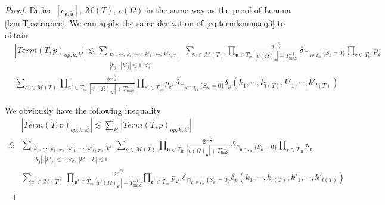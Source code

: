\begin{proof}
Define $[c_{\mathfrak{n},\widetilde{\mathfrak{n}}}]$, $\mathscr{M}(T)$, $c(\Omega)$ in the same way as the proof of Lemma \ref{lem.Tpvariance}. We can apply the same derivation of \eqref{eq.termlemmaeq3} to obtain
\begin{equation}\label{eq.termlemmaeq3op}
\begin{split}
    &|Term(T, p)_{op,k,k'}|\lesssim \sum_{\substack{k_1,\, \cdots,\, k_{l(T)},\, k'_1,\, \cdots,\, k'_{l(T)}\\ |k_{j}|, |k'_j|\lesssim 1, \forall j}} \sum_{c\in \mathscr{M}(T) }\prod_{\mathfrak{n}\in T_{\text{in}}}\frac{2^{-\frac{\tau_{\mathfrak{n}}}{2}}}{|c(\Omega)_{\mathfrak{n}}|+T^{-1}_{\text{max}}}    \ \delta_{\cap_{\mathfrak{n}\in T_{\text{in}}} \{S_{\mathfrak{n}}=0\}}\prod_{\mathfrak{e}\in T_{\text{in}}} p_{\mathfrak{e}} 
    \\
    &\sum_{c'\in \mathscr{M}(T)}\prod_{\mathfrak{n}'\in T_{\text{in}}}\frac{2^{-\frac{\tau_{\mathfrak{n}}}{2}}}{|c'(\Omega)_{\mathfrak{n}'}|+T^{-1}_{\text{max}}} \prod_{\mathfrak{e}'\in T_{\text{in}}} p_{\mathfrak{e}'}  \ \delta_{\cap_{\mathfrak{n}'\in T_{\text{in}}} \{S_{\mathfrak{n}'}=0\}} \delta_{p}(k_1,\cdots, k_{l(T)}, k'_1,\cdots, k'_{l(T)})
\end{split}
\end{equation}

We obviously have the following inequality
\begin{equation}\label{eq.termlemmaeq4op}
\begin{split}
    &|Term(T, p)_{op,k,k'}|\lesssim \sum_{k'}|Term(T, p)_{op,k,k'}|
    \\
    \lesssim& \sum_{\substack{k_1,\, \cdots,\, k_{l(T)},\, k'_1,\, \cdots,\, k'_{l(T)}, k'\\ |k_{j}|, |k'_j|\lesssim 1, \forall j,\ |k'-k|\lesssim 1}} \sum_{c\in \mathscr{M}(T) }\prod_{\mathfrak{n}\in T_{\text{in}}}\frac{2^{-\frac{\tau_{\mathfrak{n}}}{2}}}{|c(\Omega)_{\mathfrak{n}}|+T^{-1}_{\text{max}}}    \ \delta_{\cap_{\mathfrak{n}\in T_{\text{in}}} \{S_{\mathfrak{n}}=0\}} \prod_{\mathfrak{e}\in T_{\text{in}}} p_{\mathfrak{e}}
    \\
    &\sum_{c'\in \mathscr{M}(T)}\prod_{\mathfrak{n}'\in T_{\text{in}}}\frac{2^{-\frac{\tau_{\mathfrak{n}}}{2}}}{|c'(\Omega)_{\mathfrak{n}'}|+T^{-1}_{\text{max}}}  \prod_{\mathfrak{e}'\in T_{\text{in}}} p_{\mathfrak{e}'}  \ \delta_{\cap_{\mathfrak{n}'\in T_{\text{in}}} \{S_{\mathfrak{n}'}=0\}} \delta_{p}(k_1,\cdots, k_{l(T)}, k'_1,\cdots, k'_{l(T)})
\end{split}
\end{equation}


\end{proof}
